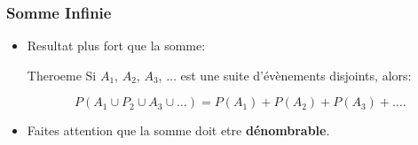 \documentclass{beamer}
\begin{document}
\begin{frame}[t]
    \frametitle{Somme Infinie}

    \begin{itemize}
        \small
        \item Resultat plus fort que la somme:
            \begin{block}{Theroeme}
               Si $A_1$, $A_2$, $A_3$, $\ldots$ est une \alert{suite}
               d'évènements  \alert{disjoints}, alors:

               \begin{equation}
                   P(A_1\cup P_2 \cup A_3\cup \ldots) = P(A_1) + P(A_2) + P(A_3)
                   + \ldots.
               \end{equation}
            \end{block}
        \item Faites attention que la somme doit etre \textbf{dénombrable}. \end{itemize}
    
\end{frame}
\end{document}

